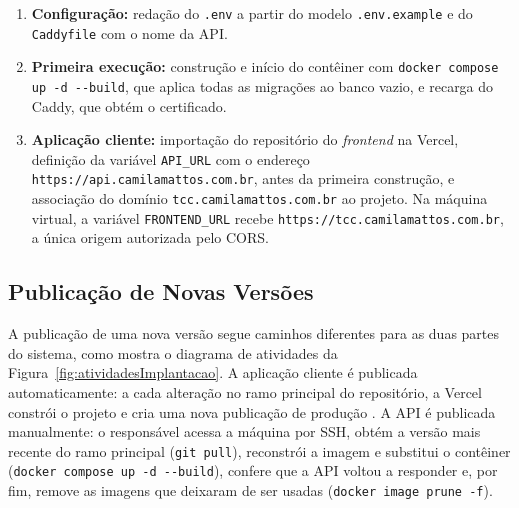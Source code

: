\begin{enumerate}
	\item \textbf{Configuração:} redação do \texttt{.env} a partir do modelo \texttt{.env.example} e do \texttt{Caddyfile} com o nome da API.
	\item \textbf{Primeira execução:} construção e início do contêiner com \texttt{docker compose up -d -{}-build}, que aplica todas as migrações ao banco vazio, e recarga do Caddy, que obtém o certificado.
	\item \textbf{Aplicação cliente:} importação do repositório do \textit{frontend} na Vercel, definição da variável \texttt{API\_URL} com o endereço \texttt{https://api.camilamattos.com.br}, antes da primeira construção, e associação do domínio \texttt{tcc.camilamattos.com.br} ao projeto. Na máquina virtual, a variável \texttt{FRONTEND\_URL} recebe \texttt{https://tcc.camilamattos.com.br}, a única origem autorizada pelo CORS.
\end{enumerate}

\subsection{Publicação de Novas Versões}

A publicação de uma nova versão segue caminhos diferentes para as duas partes do sistema, como mostra o diagrama de atividades da Figura~\ref{fig:atividadesImplantacao}. A aplicação cliente é publicada automaticamente: a cada alteração no ramo principal do repositório, a Vercel constrói o projeto e cria uma nova publicação de produção \cite{vercel2026git}. A API é publicada manualmente: o responsável acessa a máquina por SSH, obtém a versão mais recente do ramo principal (\texttt{git pull}), reconstrói a imagem e substitui o contêiner (\texttt{docker compose up -d -{}-build}), confere que a API voltou a responder e, por fim, remove as imagens que deixaram de ser usadas (\texttt{docker image prune -f}).

